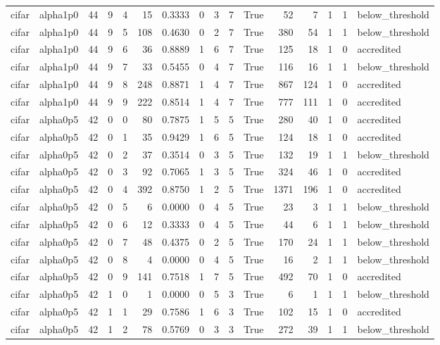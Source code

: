 \begin{tabular}{llrrrrrrrrrrrrrl}
cifar & alpha1p0 & 44 & 9 & 4 & 15 & 0.3333 & 0 & 3 & 7 & True & 52 & 7 & 1 & 1 & below\_threshold \\
cifar & alpha1p0 & 44 & 9 & 5 & 108 & 0.4630 & 0 & 2 & 7 & True & 380 & 54 & 1 & 1 & below\_threshold \\
cifar & alpha1p0 & 44 & 9 & 6 & 36 & 0.8889 & 1 & 6 & 7 & True & 125 & 18 & 1 & 0 & accredited \\
cifar & alpha1p0 & 44 & 9 & 7 & 33 & 0.5455 & 0 & 4 & 7 & True & 116 & 16 & 1 & 1 & below\_threshold \\
cifar & alpha1p0 & 44 & 9 & 8 & 248 & 0.8871 & 1 & 4 & 7 & True & 867 & 124 & 1 & 0 & accredited \\
cifar & alpha1p0 & 44 & 9 & 9 & 222 & 0.8514 & 1 & 4 & 7 & True & 777 & 111 & 1 & 0 & accredited \\
cifar & alpha0p5 & 42 & 0 & 0 & 80 & 0.7875 & 1 & 5 & 5 & True & 280 & 40 & 1 & 0 & accredited \\
cifar & alpha0p5 & 42 & 0 & 1 & 35 & 0.9429 & 1 & 6 & 5 & True & 124 & 18 & 1 & 0 & accredited \\
cifar & alpha0p5 & 42 & 0 & 2 & 37 & 0.3514 & 0 & 3 & 5 & True & 132 & 19 & 1 & 1 & below\_threshold \\
cifar & alpha0p5 & 42 & 0 & 3 & 92 & 0.7065 & 1 & 3 & 5 & True & 324 & 46 & 1 & 0 & accredited \\
cifar & alpha0p5 & 42 & 0 & 4 & 392 & 0.8750 & 1 & 2 & 5 & True & 1371 & 196 & 1 & 0 & accredited \\
cifar & alpha0p5 & 42 & 0 & 5 & 6 & 0.0000 & 0 & 4 & 5 & True & 23 & 3 & 1 & 1 & below\_threshold \\
cifar & alpha0p5 & 42 & 0 & 6 & 12 & 0.3333 & 0 & 4 & 5 & True & 44 & 6 & 1 & 1 & below\_threshold \\
cifar & alpha0p5 & 42 & 0 & 7 & 48 & 0.4375 & 0 & 2 & 5 & True & 170 & 24 & 1 & 1 & below\_threshold \\
cifar & alpha0p5 & 42 & 0 & 8 & 4 & 0.0000 & 0 & 4 & 5 & True & 16 & 2 & 1 & 1 & below\_threshold \\
cifar & alpha0p5 & 42 & 0 & 9 & 141 & 0.7518 & 1 & 7 & 5 & True & 492 & 70 & 1 & 0 & accredited \\
cifar & alpha0p5 & 42 & 1 & 0 & 1 & 0.0000 & 0 & 5 & 3 & True & 6 & 1 & 1 & 1 & below\_threshold \\
cifar & alpha0p5 & 42 & 1 & 1 & 29 & 0.7586 & 1 & 6 & 3 & True & 102 & 15 & 1 & 0 & accredited \\
cifar & alpha0p5 & 42 & 1 & 2 & 78 & 0.5769 & 0 & 3 & 3 & True & 272 & 39 & 1 & 1 & below\_threshold \\

\end{tabular}
